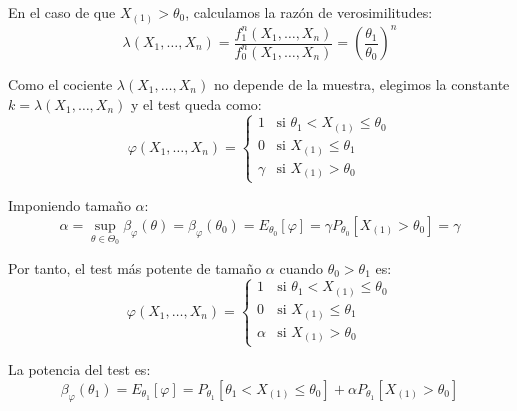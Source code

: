 \begin{ejercicio}
\begin{description}
        En el caso de que $X_{(1)} > \theta_0$, calculamos la razón de verosimilitudes:
        \begin{equation*}
            \lambda(X_1, \ldots, X_n) = \frac{f_1^n(X_1, \ldots, X_n)}{f_0^n(X_1, \ldots, X_n)} = \left(\frac{\theta_1}{\theta_0}\right)^n
        \end{equation*}

        Como el cociente $\lambda(X_1, \ldots, X_n)$ no depende de la muestra, elegimos la constante $k = \lambda(X_1, \ldots, X_n)$ y el test queda como:
        \begin{equation*}
            \varphi(X_1, \ldots, X_n) = \left\{\begin{array}{ll}
                1 & \text{si\ } \theta_1 < X_{(1)} \leq \theta_0 \\
                0 & \text{si\ } X_{(1)} \leq \theta_1 \\
                \gamma & \text{si\ } X_{(1)} > \theta_0
            \end{array}\right.
        \end{equation*}

        Imponiendo tamaño $\alpha$:
        \begin{equation*}
            \alpha = \sup_{\theta \in \Theta_0}\beta_\varphi(\theta) = \beta_\varphi(\theta_0) = E_{\theta_0}[\varphi] = \gamma P_{\theta_0}[X_{(1)} > \theta_0] = \gamma
        \end{equation*}

        Por tanto, el test más potente de tamaño $\alpha$ cuando $\theta_0 > \theta_1$ es:
        \begin{equation*}
            \varphi(X_1, \ldots, X_n) = \left\{\begin{array}{ll}
                1 & \text{si\ } \theta_1 < X_{(1)} \leq \theta_0 \\
                0 & \text{si\ } X_{(1)} \leq \theta_1 \\
                \alpha & \text{si\ } X_{(1)} > \theta_0
            \end{array}\right.
        \end{equation*}

        La potencia del test es:
        \begin{equation*}
            \beta_\varphi(\theta_1) = E_{\theta_1}[\varphi] = P_{\theta_1}[\theta_1 < X_{(1)} \leq \theta_0] + \alpha P_{\theta_1}[X_{(1)} > \theta_0]
        \end{equation*}


\end{description}
\end{ejercicio}
